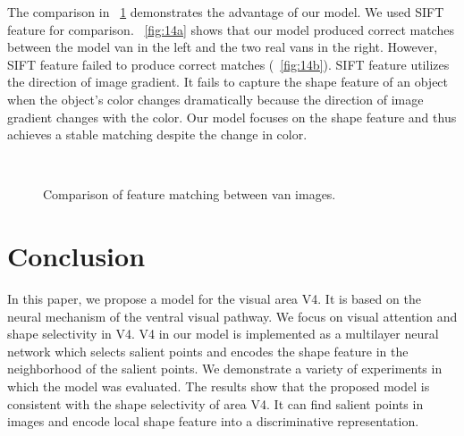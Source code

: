 \documentclass[conference]{IEEEtran}
\begin{document}
The comparison in \figurename~\ref{fig:14} demonstrates the advantage of our model.
We used SIFT feature \cite{lowe2004} for comparison.
\figurename~\ref{fig:14a} shows that our model produced correct matches between 
the model van in the left and the two real vans in the right.
However, SIFT feature failed to produce correct matches (\figurename~\ref{fig:14b}).
SIFT feature utilizes the direction of image gradient.
It fails to capture the shape feature of an object when the object's color changes dramatically
because the direction of image gradient changes with the color.
Our model focuses on the shape feature and thus achieves a stable matching despite the change in color.

\begin{figure}[htp]
\centering
{}\\
\caption{Comparison of feature matching between van images.}
\label{fig:14}
\end{figure}

\section{Conclusion}
\label{sec:5}

In this paper, we propose a model for the visual area V4.
It is based on the neural mechanism of the ventral visual pathway.
We focus on visual attention and shape selectivity in V4.
V4 in our model is implemented as a multilayer neural network 
which selects salient points and encodes the shape feature in the neighborhood of the salient points.
We demonstrate a variety of experiments in which the model was evaluated.
The results show that the proposed model is consistent with the shape selectivity of area V4.
It can find salient points in images and encode local shape feature into a discriminative representation.
\end{document}
